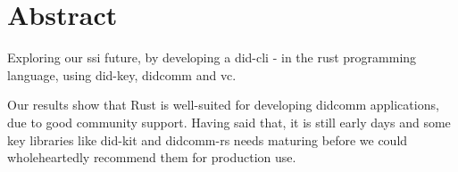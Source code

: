 \chapter*{Abstract}

Exploring our \acrfull{ssi} future, by developing a \acrfull{did-cli} - in the \gls{rust} programming language, using \gls{did-key}, \acrfull{didcomm} and \acrfull{vc}.

Our results show that Rust is well-suited for developing \acrshort{didcomm} applications, due to good community support. Having said that, it is still early days and some key libraries like \gls{did-kit} and \gls{didcomm-rs} needs  maturing before we could wholeheartedly recommend them for production use.